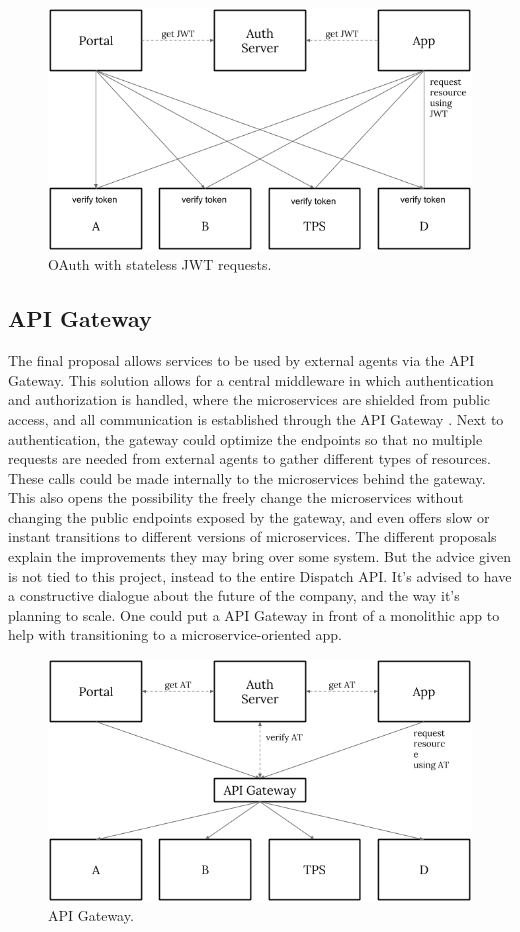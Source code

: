 \begin{figure}[H]
	\centering
	\includegraphics[width=.7\textwidth]{Auth2}
	\caption[Proposal Stateless JWT]{OAuth with stateless JWT requests.}
	\label{fig:Auth2}
\end{figure}

\subsection{API Gateway}
The final proposal allows services to be used by external agents via the API Gateway. This solution allows for a central middleware in which authentication and authorization is handled, where the microservices are shielded from public access, and all communication is established through the API Gateway \cite{api-gateway}. Next to authentication, the gateway could optimize the endpoints so that no multiple requests are needed from external agents to gather different types of resources. These calls could be made internally to the microservices behind the gateway. This also opens the possibility the freely change the microservices without changing the public endpoints exposed by the gateway, and even offers slow or instant transitions to different versions of microservices. The different proposals explain the improvements they may bring over some system. But the advice given is not tied to this project, instead to the entire Dispatch API. It’s advised to have a constructive dialogue about the future of the company, and the way it’s planning to scale. One could put a API Gateway in front of a monolithic app to help with transitioning to a microservice-oriented app.

\begin{figure}[H]
	\centering
	\includegraphics[width=.7\textwidth]{Auth3}
	\caption[Proposal API Gateway]{API Gateway.}
	\label{fig:Auth3}
\end{figure}

